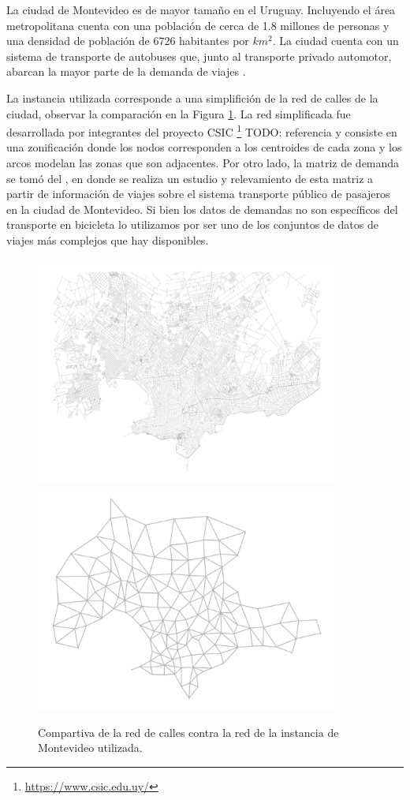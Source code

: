\documentclass{article}
\begin{document}
  La ciudad de Montevideo es de mayor tamaño en el Uruguay. Incluyendo el área metropolitana cuenta con una población de cerca de 1.8 millones de personas y una densidad de población de 6726 habitantes por $km^2$. La ciudad cuenta con un sistema de transporte de autobuses que, junto al transporte privado automotor, abarcan la mayor parte de la demanda de viajes \cite{Mauttone2017a}.

  La instancia utilizada corresponde a una simplifición de la red de calles de la ciudad, observar la comparación en la Figura \ref{fig:montevideosimplification}. La red simplificada fue desarrollada por integrantes del proyecto CSIC \footnote{\url{https://www.csic.edu.uy/}} TODO: referencia y consiste en una zonificación donde los nodos corresponden a los centroides de cada zona y los arcos modelan las zonas que son adjacentes. Por otro lado, la matriz de demanda se tomó del \cite{Massobrio2020}, en donde se realiza un estudio y relevamiento de esta matriz a partir de información de viajes sobre el sistema transporte público de pasajeros en la ciudad de Montevideo. Si bien los datos de demandas no son específicos del transporte en bicicleta lo utilizamos por ser uno de los conjuntos de datos de viajes más complejos que hay disponibles.

  \begin{figure}[h!]
    \centering
    \includegraphics[width=10cm]{../resources/montevideo_full.png}
    \includegraphics[width=10cm]{../resources/montevideo_simple.png}
    \caption{Compartiva de la red de calles contra la red de la instancia de Montevideo utilizada.}
    \label{fig:montevideosimplification}
  \end{figure}
\end{document}
